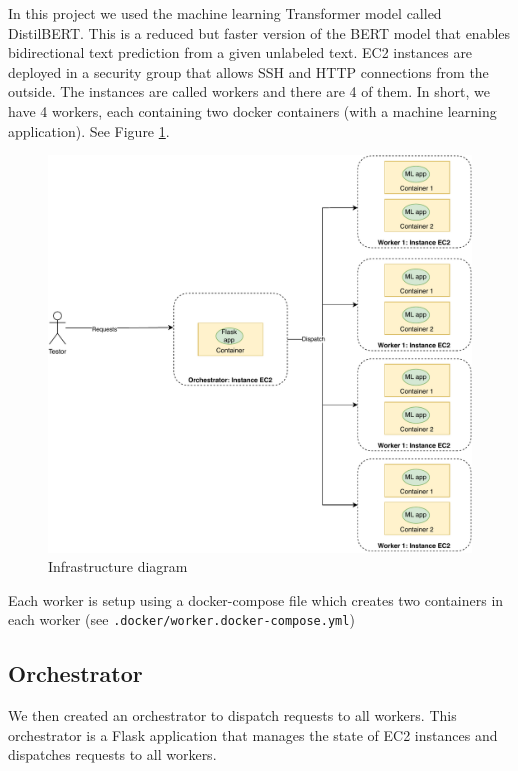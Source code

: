 \documentclass[letterpaper,headings=standardclasses,parskip=half]{scrartcl}
\begin{document}
In this project we used the machine learning Transformer model called
DistilBERT. This is a reduced but faster version of the BERT model that enables
bidirectional text prediction from a given unlabeled text. EC2 instances are
deployed in a security group that allows SSH and HTTP connections from the
outside. The instances are called workers and there are 4 of them. In short, we
have 4 workers, each containing two docker containers (with a machine learning application). See Figure \ref{fig:infra}.

\begin{figure}[H]
    \centering
    \includegraphics[width=\textwidth]{images/infra.pdf}
    \caption{Infrastructure diagram}
    \label{fig:infra}
\end{figure}

Each worker is setup using a docker-compose file which creates two containers in each worker (see \texttt{.docker/worker.docker-compose.yml})

\subsection{Orchestrator}

We then created an orchestrator to dispatch requests to all workers. This orchestrator is a Flask application that manages the state of EC2 instances and dispatches requests to all workers.
\end{document}
